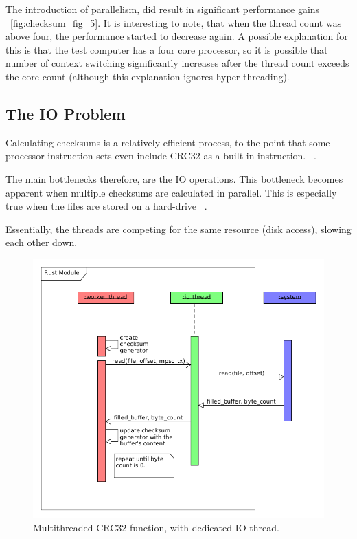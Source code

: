 The introduction of parallelism, did result in significant performance gains ~\ref{fig:checksum_fig_5}.
It is interesting to note, that when the thread count was above four, the performance started to decrease again.
A possible explanation for this is that the test computer has a four core processor, so it is possible that number of context
switching significantly increases after the thread count exceeds the core count (although this explanation
ignores hyper-threading).

\subsection{The IO Problem}
Calculating checksums is a relatively efficient process, to the point that
some processor instruction sets even include CRC32
as a built-in instruction. ~\cite{CRC32Instruction}.

The main bottlenecks therefore, are the IO operations.
This bottleneck becomes apparent when multiple checksums are calculated in parallel.
This is especially true when the files are stored on a hard-drive ~\cite{PiotrParallelDiskAccess}.

Essentially, the threads are competing for the same resource (disk access), slowing each other down.

\begin{figure}[H]
    \centering
    \includegraphics[width=12cm]{figures/checksum/io_multi_crc}
    \caption{Multithreaded CRC32 function, with dedicated IO thread.}
    \label{fig:checksum_fig_6}
\end{figure}

